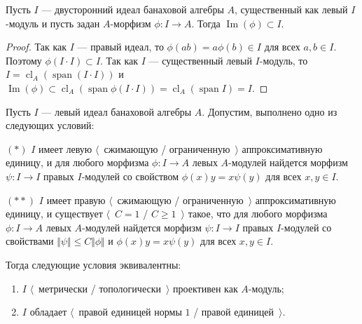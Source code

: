 \begin{lemma}\label{ImgOfAMorphFromBiIdToA} Пусть $I$ --- двусторонний идеал
банаховой алгебры $A$, существенный как левый $I$-модуль и пусть задан
$A$-морфизм $\phi:I\to A$. Тогда $\operatorname{Im}(\phi)\subset I$.
\end{lemma}
\begin{proof} Так как $I$ --- правый идеал, то $\phi(ab)=a\phi(b)\in I$ для всех
$a,b\in I$. Поэтому $\phi(I\cdot I)\subset I$. Так как $I$ --- существенный
левый $I$-модуль, то $I=\operatorname{cl}_A(\operatorname{span}(I\cdot I))$ и
$\operatorname{Im}(\phi)\subset\operatorname{cl}_A(\operatorname{span}\phi(I\cdot
I))=\operatorname{cl}_A(\operatorname{span}I)=I$.
\end{proof}

\begin{lemma}\label{GoodIdealMetTopProjIsUnital} Пусть $I$ --- левый идеал
банаховой алгебры $A$. Допустим, выполнено одно из следующих условий:

$(*)$ $I$ имеет левую $\langle$~сжимающую / ограниченную~$\rangle$
аппроксимативную единицу, и для любого морфизма $\phi:I\to A$ левых $A$-модулей
найдется морфизм $\psi:I\to I$ правых $I$-модулей со свойством
$\phi(x)y=x\psi(y)$ для всех $x,y\in I$.

$(**)$ $I$ имеет правую $\langle$~сжимающую / ограниченную~$\rangle$
аппроксимативную единицу, и существует $\langle$~$C=1$ / $C\geq 1$~$\rangle$
такое, что для любого морфизма $\phi:I\to A$ левых $A$-модулей найдется морфизм
$\psi:I\to I$ правых $I$-модулей со свойствами $\Vert\psi\Vert\leq
C\Vert\phi\Vert$ и $\phi(x)y=x\psi(y)$ для всех $x,y\in I$.

Тогда следующие условия эквивалентны:
\begin{enumerate}[label = (\roman*)]
    \item $I$ $\langle$~метрически / топологически~$\rangle$ проективен как
    $A$-модуль;

    \item $I$ обладает $\langle$~правой единицей нормы $1$ / правой
    единицей~$\rangle$.
\end{enumerate}
\end{lemma} 
